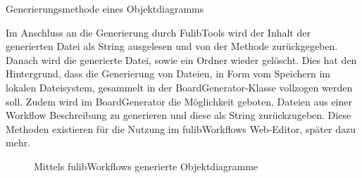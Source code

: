\begin{listing}[!ht]
    \inputminted[firstnumber=95]{java}{listings/3.1.4/ObjectGeneration.java}
    \caption{Generierungsmethode eines Objektdiagramms}
    \label{listing:object-gen}
\end{listing}

Im Anschluss an die Generierung durch FulibTools wird der Inhalt der generierten Datei als String ausgelesen und von der Methode zurückgegeben.
Danach wird die generierte Datei, sowie ein Ordner wieder gelöscht.
Dies hat den Hintergrund, dass die Generierung von Dateien, in Form vom Speichern im lokalen Dateisystem, gesammelt in der BoardGenerator-Klasse vollzogen werden soll.
Zudem wird im BoardGenerator die Möglichkeit geboten, Dateien aus einer Workflow Beschreibung zu generieren und diese als String zurückzugeben.
Diese Methoden existieren für die Nutzung im fulibWorkflows Web-Editor, später dazu mehr.

\begin{figure}%
    \centering
    \qquad
    \caption{Mittels fulibWorkflows generierte Objektdiagramme}%
    \label{fig:generated-object}%
\end{figure}

